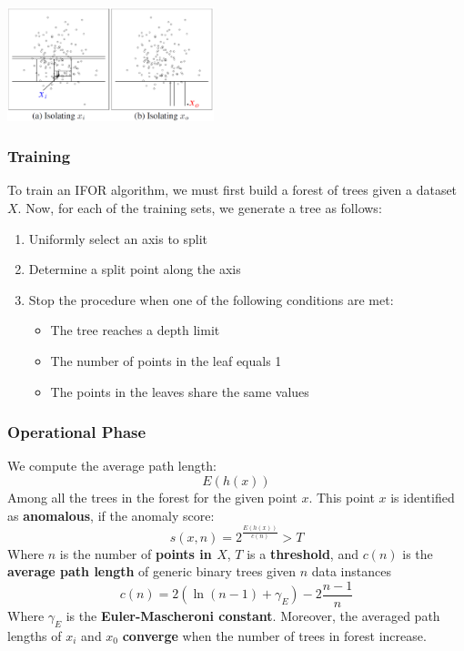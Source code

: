 \documentclass{article}
\begin{document}
\begin{center}
	\includegraphics[width=6cm]{assets/ifor.png}
\end{center}

\subsubsection{Training}
To train an IFOR algorithm, we must first build a forest of trees given a dataset $X$. Now, for each of the training sets, we generate a tree as follows:

\begin{enumerate}
	\item Uniformly select an axis to split
	\item Determine a split point along the axis
	\item Stop the procedure when one of the following conditions are met:
	\begin{itemize}
		\item The tree reaches a depth limit
		\item The number  of points in the leaf equals 1
		\item The points in the leaves share the same values
	\end{itemize}
\end{enumerate}

\subsubsection{Operational Phase}
We compute the average path length:
\[ E(h(x)) \]
Among all the trees in the forest for the given point $x$. This point $x$ is identified as \textbf{anomalous}, if the anomaly score:
\[ s(x, n) = 2^{\frac{E(h(x))}{c(n)}} > T \]
Where $n$ is the number of \textbf{points in $X$}, $T$ is a \textbf{threshold}, and $c(n)$ is the \textbf{average path length} of generic binary trees given $n$ data instances
\[ c(n) = 2(\ln(n-1) + \gamma_E) - 2\frac{n-1}{n} \]
Where $\gamma_E$ is the \textbf{Euler-Mascheroni constant}. Moreover, the averaged path lengths of $x_i$ and $x_0$ \textbf{converge} when the number of trees in forest increase.
\end{document}

